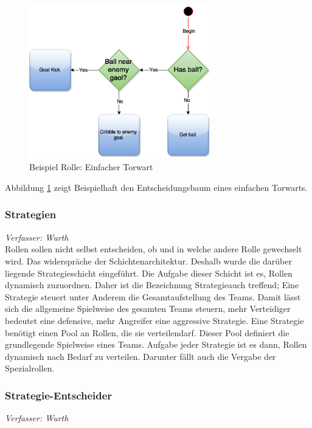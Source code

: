 \documentclass[fontsize=12pt,a4paper,final]{scrartcl}[2003/01/01]
\begin{document}
\begin{figure}[H]
	\centering
	\includegraphics[width=0.7\textwidth]{Grafiken/KI/simple_Player}
	\caption{Beispiel Rolle: Einfacher Torwart}
	\label{Simple keeper}
\end{figure}

Abbildung \ref{Simple keeper} zeigt Beispielhaft den Entscheidungsbaum eines einfachen Torwarts.

\subsubsection{Strategien}
\textit{Verfasser: Wurth}\\

Rollen sollen nicht selbst entscheiden, ob und in welche andere Rolle gewechselt wird. Das widerspräche der Schichtenarchitektur. Deshalb wurde die darüber liegende Strategieschicht eingeführt. Die Aufgabe dieser Schicht ist es, Rollen dynamisch zuzuordnen. Daher ist die Bezeichnung \glqq Strategie\grqq auch treffend; Eine Strategie steuert unter Anderem die Gesamtaufstellung des Teams. Damit lässt sich die allgemeine Spielweise des gesamten Teams steuern, mehr Verteidiger bedeutet eine defensive, mehr Angreifer eine aggressive Strategie. Eine Strategie benötigt einen Pool an Rollen, die sie \glqq verteilen\grqq darf. Dieser Pool definiert die grundlegende Spielweise eines Teams. Aufgabe jeder Strategie ist es dann, Rollen dynamisch nach Bedarf zu verteilen. Darunter fällt auch die Vergabe der Spezialrollen.

\subsubsection{Strategie-Entscheider}
\textit{Verfasser: Wurth}\\
\end{document}
